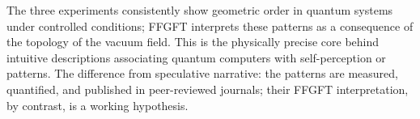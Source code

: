 \begin{table}[ht]
\centering
{}
\caption{Three Willow results and their FFGFT interpretation}
\end{table}

The three experiments consistently show geometric order in quantum systems under
controlled conditions; FFGFT interprets these patterns as a consequence of the topology
of the vacuum field.
This is the physically precise core behind intuitive descriptions associating quantum
computers with self-perception or patterns. The difference from speculative narrative:
the patterns are measured, quantified, and published in peer-reviewed journals; their
FFGFT interpretation, by contrast, is a working hypothesis.

\vspace{0.8cm}

